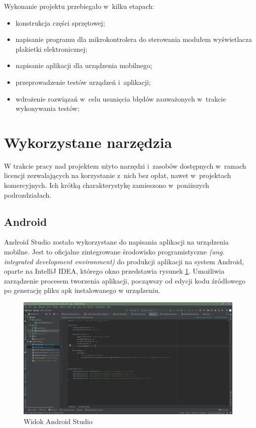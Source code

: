 \documentclass[a4paper,12pt, twoside]{article}
\begin{document}
    	\begin{flushleft}
    	Wykonanie projektu przebiegało w~kilku etapach:
    	\begin{itemize}
    	    \item konstrukcja części sprzętowej;
    	    \item napisanie programu dla mikrokontrolera do sterowania modułem wyświetlacza plakietki elektronicznej;
    	    \item napisanie aplikacji dla urządzenia mobilnego;
    	    \item przeprowadzenie testów urządzeń i~aplikacji;
    	    \item wdrożenie rozwiązań w~celu usunięcia błędów zauważonych w~trakcie wykonywania testów;
    	\end{itemize}
    	\end{flushleft}
 
        \newpage
    	\section{Wykorzystane narzędzia}
    	W trakcie pracy nad projektem użyto narzędzi i~zasobów dostępnych w~ramach licencji zezwalających na korzystanie z~nich bez opłat, nawet w~projektach komercyjnych. Ich krótką charakterystykę zamieszono w~poniższych podrozdziałach. 
    	
    	\subsection{Android}
    	Android Studio zostało wykorzystane do napisania aplikacji na urządzenia mobilne. Jest to oficjalne zintegrowane środowisko programistyczne \textit{(ang. integrated development environment)} \cite{ide} do produkcji aplikacji na system Android, oparte na IntelliJ IDEA, którego okno przedstawia rysunek \ref{fig:androidstudio}. Umożliwia zarządzenie procesem tworzenia aplikacji, począwszy od edycji kodu źródłowego po generację pliku apk instalowanego w urządzeniu. 
    	
    	\begin{figure}[H]
    	    \centering
    		\includegraphics[width=1\textwidth]{images/rys4_android.png}
    		\caption{Widok Android Studio}
            \label{fig:androidstudio}
    	\end{figure}
     	
\end{document}
